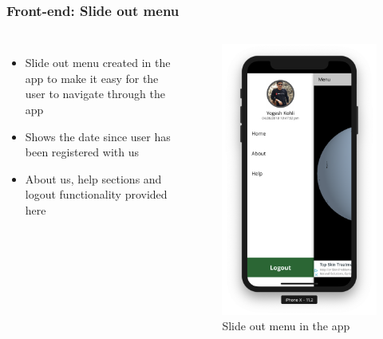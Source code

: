 \begin{frame}
\frametitle{Front-end: Slide out menu}
\begin{columns}

\begin{itemize}
    \item Slide out menu created in the app to make it easy for the user to navigate through the app
    \item Shows the date since user has been registered with us
    \item About us, help sections and logout functionality provided here
\end{itemize}

\begin{figure}
    \centering
    \begin{minipage}{.5\columnwidth}
    \includegraphics[width=\linewidth]{final/figures/side_menu.png}
    \caption{Slide out menu in the app}
    \end{minipage}
\end{figure}
\end{columns}
\end{frame}

